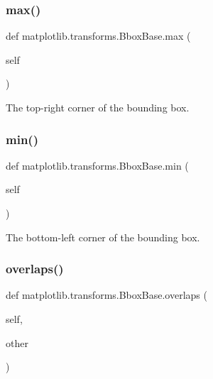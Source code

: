 \subsubsection{\texorpdfstring{max()}{max()}}
{\footnotesize\ttfamily def matplotlib.\+transforms.\+Bbox\+Base.\+max (\begin{DoxyParamCaption}\item[{}]{self }\end{DoxyParamCaption})}

\begin{DoxyVerb}The top-right corner of the bounding box.\end{DoxyVerb}
 \mbox{\label{classmatplotlib_1_1transforms_1_1BboxBase_a68fed28299d02712de3160422da7319c}} 
\subsubsection{\texorpdfstring{min()}{min()}}
{\footnotesize\ttfamily def matplotlib.\+transforms.\+Bbox\+Base.\+min (\begin{DoxyParamCaption}\item[{}]{self }\end{DoxyParamCaption})}

\begin{DoxyVerb}The bottom-left corner of the bounding box.\end{DoxyVerb}
 \mbox{\label{classmatplotlib_1_1transforms_1_1BboxBase_a9d4c1134c2e1ea21f0703facd163c87c}} 
\subsubsection{\texorpdfstring{overlaps()}{overlaps()}}
{\footnotesize\ttfamily def matplotlib.\+transforms.\+Bbox\+Base.\+overlaps (\begin{DoxyParamCaption}\item[{}]{self,  }\item[{}]{other }\end{DoxyParamCaption})}

